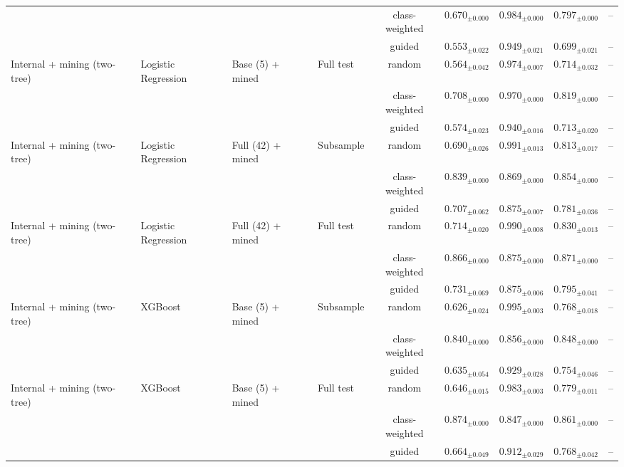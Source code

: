 \begin{longtable}{llllcccc}
 &  &  &  & class-weighted & $0.670_{\pm 0.000}$ & $0.984_{\pm 0.000}$ & $0.797_{\pm 0.000}$ & -- \\
 &  &  &  & guided & $0.553_{\pm 0.022}$ & $0.949_{\pm 0.021}$ & $0.699_{\pm 0.021}$ & -- \\
\addlinespace
Internal + mining (two-tree) & Logistic Regression & Base (5) + mined & Full test & random & $0.564_{\pm 0.042}$ & $0.974_{\pm 0.007}$ & $0.714_{\pm 0.032}$ & -- \\
 &  &  &  & class-weighted & $0.708_{\pm 0.000}$ & $0.970_{\pm 0.000}$ & $0.819_{\pm 0.000}$ & -- \\
 &  &  &  & guided & $0.574_{\pm 0.023}$ & $0.940_{\pm 0.016}$ & $0.713_{\pm 0.020}$ & -- \\
\addlinespace
Internal + mining (two-tree) & Logistic Regression & Full (42) + mined & Subsample & random & $0.690_{\pm 0.026}$ & $0.991_{\pm 0.013}$ & $0.813_{\pm 0.017}$ & -- \\
 &  &  &  & class-weighted & $0.839_{\pm 0.000}$ & $0.869_{\pm 0.000}$ & $0.854_{\pm 0.000}$ & -- \\
 &  &  &  & guided & $0.707_{\pm 0.062}$ & $0.875_{\pm 0.007}$ & $0.781_{\pm 0.036}$ & -- \\
\addlinespace
Internal + mining (two-tree) & Logistic Regression & Full (42) + mined & Full test & random & $0.714_{\pm 0.020}$ & $0.990_{\pm 0.008}$ & $0.830_{\pm 0.013}$ & -- \\
 &  &  &  & class-weighted & $0.866_{\pm 0.000}$ & $0.875_{\pm 0.000}$ & $0.871_{\pm 0.000}$ & -- \\
 &  &  &  & guided & $0.731_{\pm 0.069}$ & $0.875_{\pm 0.006}$ & $0.795_{\pm 0.041}$ & -- \\
\addlinespace
Internal + mining (two-tree) & XGBoost & Base (5) + mined & Subsample & random & $0.626_{\pm 0.024}$ & $0.995_{\pm 0.003}$ & $0.768_{\pm 0.018}$ & -- \\
 &  &  &  & class-weighted & $0.840_{\pm 0.000}$ & $0.856_{\pm 0.000}$ & $0.848_{\pm 0.000}$ & -- \\
 &  &  &  & guided & $0.635_{\pm 0.054}$ & $0.929_{\pm 0.028}$ & $0.754_{\pm 0.046}$ & -- \\
\addlinespace
Internal + mining (two-tree) & XGBoost & Base (5) + mined & Full test & random & $0.646_{\pm 0.015}$ & $0.983_{\pm 0.003}$ & $0.779_{\pm 0.011}$ & -- \\
 &  &  &  & class-weighted & $0.874_{\pm 0.000}$ & $0.847_{\pm 0.000}$ & $0.861_{\pm 0.000}$ & -- \\
 &  &  &  & guided & $0.664_{\pm 0.049}$ & $0.912_{\pm 0.029}$ & $0.768_{\pm 0.042}$ & -- \\

\end{longtable}
